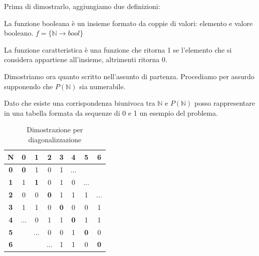 \begin{exercise}
    
    Prima di dimostrarlo, aggiungiamo due definizioni:

    \begin{definition}
        
        La funzione booleana è un insieme formato da coppie di valori: elemento e valore booleano.
        $f=\{\mathbb{N}\rightarrow bool\}$
    \end{definition}

    \begin{definition}
        
        La funzione caratteristica è una funzione che ritorna 1 se l'elemento che si considera appartiene all'insieme, altrimenti ritorna 0. 
        \end{definition}

        Dimostriamo ora quanto scritto nell'assunto di partenza. Procediamo per assurdo supponendo che $P(\mathbb{N})$ sia numerabile.

        Dato che esiste una corrispondenza biunivoca tra $\mathbb{N}$ e $P(\mathbb{N})$ posso rappresentare in una tabella formata da sequenze di 0 e 1 un esempio del problema.
    
        \setlength{\tabcolsep}{13pt}
        \renewcommand{\arraystretch}{1}
        \begin{table}[ht]
            \centering
            \begin{tabular}{|c||c|c|c|c|c|c|c}
                 \hline \textbf{N}&\textbf{0}&\textbf{1}&\textbf{2}&\textbf{3}&\textbf{4}&\textbf{5}&\textbf{6}\\\hline\hline
                 \textbf{0}&\textbf{0}&1&0&1&...&&\\\hline
                 \textbf{1}&1&\textbf{1}&0&1&0&...&\\\hline
                 \textbf{2}&0&0&\textbf{0}&1&1&1&...\\\hline
                 \textbf{3}&1&1&0&\textbf{0}&0&0&1\\\hline
                 \textbf{4}&...&0&1&1&\textbf{0}&1&1\\\hline
                 \textbf{5}&&...&0&0&1&\textbf{0}&0\\\hline
                 \textbf{6}&&&...&1&1&0&\textbf{0}
            \end{tabular}
            \caption{Dimostrazione per diagonalizzazione}
            \label{tab:non_numerab}
        \end{table}
        

\end{exercise}
